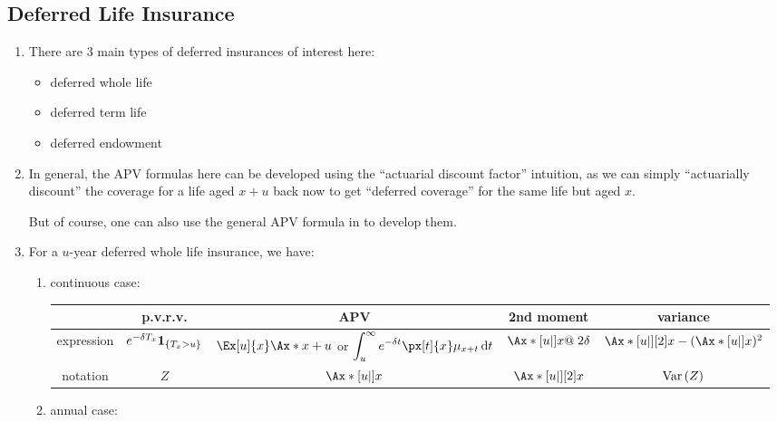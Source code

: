 \subsection{Deferred Life Insurance}
\label{subsect:defer-insurance}
\begin{enumerate}
\item There are 3 main types of deferred insurances of interest here:
\begin{itemize}
\item deferred whole life
\item deferred term life
\item deferred endowment
\end{itemize}
\item In general, the APV formulas here can be developed using the ``actuarial
discount factor'' intuition, as we can simply ``actuarially discount'' the
coverage for a life aged \(x+u\) back now to get ``deferred coverage'' for the
same life but aged \(x\).


But of course, one can also use the general APV formula in  to develop them.
\item For a \(u\)-year deferred whole life insurance, we have:
\begin{enumerate}
\item continuous case:
\label{it:deferred-cts-whole-life-fmlas}

\begin{tabular}{ccccc}
\toprule
&p.v.r.v.&APV&2nd moment&variance\\
\midrule
expression&\(e^{-\delta T_x}\mathbf{1}_{\left\{T_x>u\right\}}\)
&\(\Ex[u]{x}\Ax*{x+u}\) or \(\displaystyle\int_{u}^{\infty}e^{-\delta t}\px[t]{x}\mu_{x+t}\dd{t}\)
&\(\Ax*[u|]{x}@\;2\delta\)&\(\Ax*[u|][2]{x}-(\Ax*[u|]{x})^2\)\\
notation&\(Z\)&\(\Ax*[u|]{x}\)&\(\Ax*[u|][2]{x}\)&\(\operatorname{Var}\qty(Z)\)\\
\bottomrule
\end{tabular}
\item annual case:
\label{it:deferred-annual-whole-life-fmlas}


\end{enumerate}
\end{enumerate}
